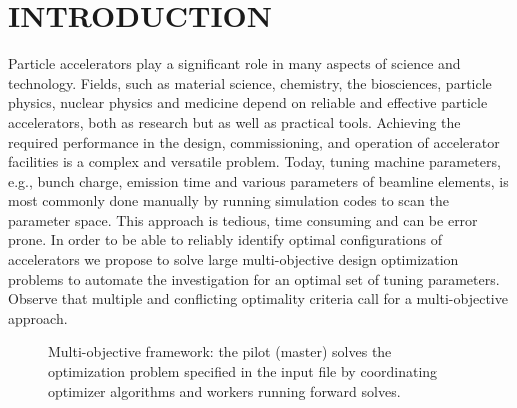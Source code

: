 \documentclass[%
reprint,
amsmath,amssymb,
aps,
prstab,
]{revtex4-1}
\begin{document}
\maketitle


\section{INTRODUCTION} \label{sec:introduction}

Particle accelerators play a significant role in many aspects of science and
  technology.
Fields, such as material science, chemistry, the biosciences, particle
  physics, nuclear physics and medicine depend on reliable and effective
  particle accelerators, both as research but as well as practical tools.
Achieving the required performance in the design, commissioning, and operation
  of accelerator facilities is a complex and versatile problem.
Today, tuning machine parameters, e.g., bunch charge, emission time and
  various parameters of beamline elements, is most commonly done manually by
  running simulation codes to scan the parameter space.
This approach is tedious, time consuming and can be error prone.
In order to be able to reliably identify optimal configurations of
  accelerators we propose to solve large multi-objective design optimization
  problems to automate the investigation for an optimal set of tuning
  parameters.
Observe that multiple and conflicting optimality criteria call for a
  multi-objective approach.

\begin{figure}%
	\scalebox{0.8}{
	\pgfdeclarelayer{background}
	\pgfsetlayers{background,main}
	\begin{tikzpicture}[text=black]%
	
	\end{tikzpicture}
}
\caption{Multi-objective framework: the pilot (master) solves the
	optimization problem specified in the input file by coordinating optimizer
	algorithms and workers running forward solves.}
\end{figure}\label{fig:framenetwork}
\end{document}
